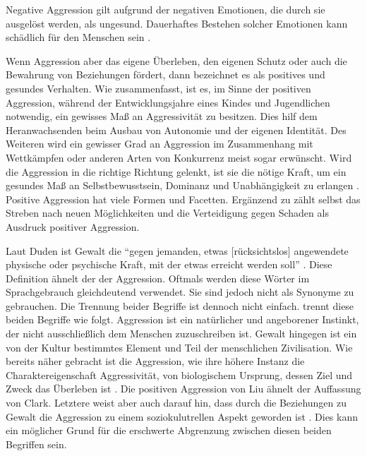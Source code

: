 Negative Aggression gilt aufgrund der negativen Emotionen, die durch sie ausgelöst werden, als ungesund. Dauerhaftes Bestehen solcher Emotionen kann  schädlich für den Menschen sein \parencite{Aggression}.

Wenn Aggression aber das eigene Überleben, den eigenen Schutz oder auch die Bewahrung von Beziehungen fördert, dann bezeichnet \textcite{positive_aggression} 
es als positives und gesundes Verhalten. Wie \textcite{Aggression} zusammenfasst, ist es, im Sinne der positiven Aggression, während der Entwicklungsjahre eines 
Kindes und Jugendlichen notwendig, ein gewisses Maß an Aggressivität zu besitzen. Dies hilf dem Heranwachsenden beim Ausbau von Autonomie und der eigenen Identität. Des Weiteren wird ein gewisser Grad an Aggression im Zusammenhang mit Wettkämpfen oder anderen Arten von Konkurrenz meist sogar erwünscht. Wird die Aggression in die richtige Richtung gelenkt, ist sie die nötige Kraft, um ein gesundes Maß an Selbstbewusstsein, Dominanz und Unabhängigkeit zu erlangen \parencite{Aggression}. Positive Aggression hat viele Formen und Facetten. Ergänzend zu \textcite{positive_aggression} zählt \textcite{jack1999behind} selbst das Streben nach neuen Möglichkeiten und die Verteidigung gegen Schaden als Ausdruck positiver Aggression.

Laut Duden ist Gewalt die \enquote{gegen jemanden, etwas [rücksichtslos] angewendete physische oder psychische Kraft, mit der etwas erreicht werden soll} \parencite{Gewalt_Duden}. Diese Definition ähnelt der der Aggression. Oftmals werden diese Wörter im Sprachgebrauch gleichdeutend verwendet. Sie sind jedoch nicht als Synonyme zu gebrauchen. Die Trennung beider Begriffe ist dennoch nicht einfach. \textcite{Def_Aggressivität_vs_violence} trennt diese beiden Begriffe wie folgt. Aggression ist ein natürlicher und angeborener Instinkt, der nicht ausschließlich dem Menschen zuzuschreiben ist. Gewalt hingegen ist ein von der Kultur bestimmtes Element und Teil der menschlichen Zivilisation. Wie bereits näher gebracht ist die Aggression, wie ihre höhere Instanz die Charaktereigenschaft Aggressivität, von biologischem Ursprung, dessen Ziel und Zweck das Überleben ist \parencite{Def_Aggressivität_vs_violence, Aggression}.
Die positiven Aggression von Liu ähnelt der Auffassung von Clark. Letztere weist aber auch darauf hin, dass durch die Beziehungen zu Gewalt die Aggression zu einem soziokulutrellen Aspekt geworden ist \parencite{Def_Aggressivität_vs_violence}.
Dies kann ein möglicher Grund für die erschwerte Abgrenzung zwischen diesen beiden
Begriffen sein. 

